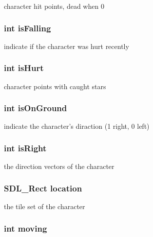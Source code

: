 character hit points, dead when 0 \hypertarget{struct_character_a1f82fe73359859bfa39df1d66d6e652a}{
\subsubsection[{is\-Falling}]{\setlength{\rightskip}{0pt plus 5cm}int is\-Falling}}\label{struct_character_a1f82fe73359859bfa39df1d66d6e652a}
indicate if the character was hurt recently \hypertarget{struct_character_a707f2ed2ff6b487daef553437fe9751d}{
\subsubsection[{is\-Hurt}]{\setlength{\rightskip}{0pt plus 5cm}int is\-Hurt}}\label{struct_character_a707f2ed2ff6b487daef553437fe9751d}
character points with caught stars \hypertarget{struct_character_aa4061d19d285d0ef281f333dee8f9a00}{
\subsubsection[{is\-On\-Ground}]{\setlength{\rightskip}{0pt plus 5cm}int is\-On\-Ground}}\label{struct_character_aa4061d19d285d0ef281f333dee8f9a00}
indicate the character's diraction (1 right, 0 left) \hypertarget{struct_character_ac73a92163fd55152d03d0aaca5093b72}{
\subsubsection[{is\-Right}]{\setlength{\rightskip}{0pt plus 5cm}int is\-Right}}\label{struct_character_ac73a92163fd55152d03d0aaca5093b72}
the direction vectors of the character \hypertarget{struct_character_a08e7ab1c2395b84bea7ca13eb99bac60}{
\subsubsection[{location}]{\setlength{\rightskip}{0pt plus 5cm}S\-D\-L\-\_\-\-Rect location}}\label{struct_character_a08e7ab1c2395b84bea7ca13eb99bac60}
the tile set of the character \hypertarget{struct_character_ad892143587536d5edaac114b6d9b38f6}{
\subsubsection[{moving}]{\setlength{\rightskip}{0pt plus 5cm}int moving}}\label{struct_character_ad892143587536d5edaac114b6d9b38f6}
